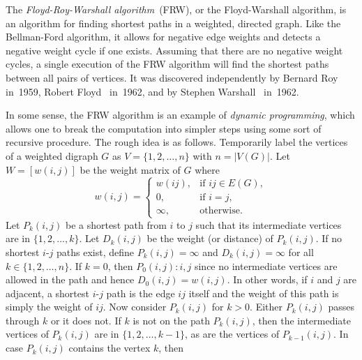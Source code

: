 The
\emph{Floyd-Roy-Warshall algorithm}~(FRW), or the
Floyd-Warshall algorithm, is an algorithm for finding shortest
paths in a weighted, directed graph. Like the
Bellman-Ford algorithm, it allows for
negative edge weights and detects a negative
weight cycle if one exists. Assuming that there
are no negative weight cycles, a single execution of the
FRW algorithm will find the shortest paths between all
pairs of vertices. It was discovered independently by Bernard
Roy~\cite{Roy1959} in~1959, Robert
Floyd~\cite{Floyd1962} in~1962, and by Stephen
Warshall~\cite{Warshall1962} in~1962.

In some sense, the FRW algorithm is an example of
\emph{dynamic programming}, which allows
one to break the computation into simpler steps using some sort of
recursive procedure. The rough idea is as
follows. Temporarily label the vertices of a weighted digraph $G$ as
$V = \{1,2,\dots,n\}$ with $n = |V(G)|$. Let $W = [w(i,j)]$ be the
weight matrix of $G$ where
\begin{equation}
\label{eqn:graph_algorithms:Floyd_Roy_Warshall_weight_matrix}
w(i,j)
=
\begin{cases}
w(ij), & \text{if $ij \in E(G)$}, \\[4pt]
0, & \text{if $i = j$}, \\[4pt]
\infty, & \text{otherwise}.
\end{cases}
\end{equation}
Let $P_k(i,j)$ be a shortest path from $i$ to $j$
such that its intermediate vertices are in $\{1, 2, \dots, k\}$. Let
$D_k(i,j)$ be the weight (or distance)
of $P_k(i,j)$. If no shortest $i$-$j$ paths exist, define
$P_k(i,j) = \infty$ and $D_k(i,j) = \infty$ for all
$k \in \{1, 2, \dots, n\}$. If $k = 0$, then $P_0(i,j): i, j$ since no
intermediate vertices are allowed in the path and hence
$D_0(i,j) = w(i,j)$. In other words, if $i$ and $j$ are adjacent, a
shortest $i$-$j$ path is the edge $ij$ itself and the weight of this
path is simply the weight of $ij$. Now consider $P_k(i,j)$ for
$k > 0$. Either $P_k(i,j)$ passes through $k$ or it does not. If $k$
is not on the path $P_k(i,j)$, then the intermediate vertices of
$P_k(i,j)$ are in  $\{1, 2, \dots, k-1\}$, as are the vertices of
$P_{k-1}(i,j)$. In case $P_k(i,j)$ contains the vertex $k$, then

